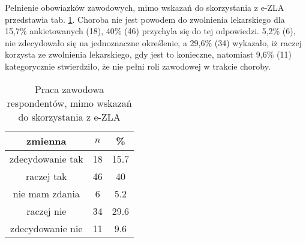  Pełnienie obowiazków zawodowych, mimo wskazań do skorzystania z e-ZLA przedstawia tab. \ref{tab:Q32}. Choroba nie jest powodem do zwolnienia lekarskiego dla 15,7\% ankietowanych (18), 40\% (46) przychyla się do tej odpowiedzi. 5,2\% (6), nie zdecydowało się na jednoznaczne określenie, a 29,6\% (34) wykazało, iż raczej korzysta ze zwolnienia lekarskiego, gdy jest to konieczne, natomiast 9,6\% (11) kategorycznie stwierdziło, że nie pełni roli zawodowej w trakcie choroby.

\begin{table}[H]
\caption{Praca zawodowa respondentów, mimo wskazań do skorzystania z e-ZLA}
\centering
\begin{tabular}{ | c | c | c |}
\hline
zmienna & $n$ & \% \\
\hline
zdecydowanie tak  &  18  & 15.7 \\
\hline
raczej tak  &  46  & 40 \\
\hline
nie mam zdania  &  6  & 5.2 \\
\hline
raczej nie  &  34  & 29.6 \\
\hline
zdecydowanie nie  &  11  & 9.6 \\
\hline
\end{tabular}
\label{tab:Q32}
\end{table}
